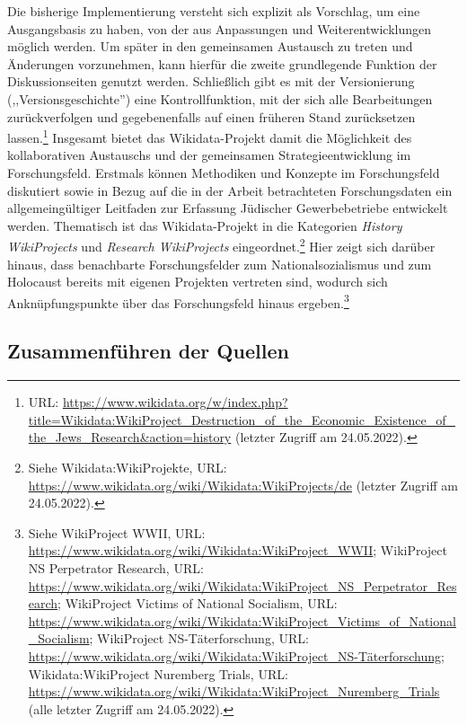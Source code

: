 Die bisherige Implementierung versteht sich explizit als Vorschlag, um eine Ausgangsbasis zu haben, von der aus Anpassungen und Weiterentwicklungen möglich werden. Um später in den gemeinsamen Austausch zu treten und Änderungen vorzunehmen, kann hierfür die zweite grundlegende Funktion der Diskussionseiten genutzt werden. Schließlich gibt es mit der Versionierung (,,Versionsgeschichte'') eine Kontrollfunktion, mit der sich alle Bearbeitungen zurückverfolgen und gegebenenfalls auf einen früheren Stand zurücksetzen lassen.\footnote{URL: \url{https://www.wikidata.org/w/index.php?title=Wikidata:WikiProject_Destruction_of_the_Economic_Existence_of_the_Jews_Research&action=history} (letzter Zugriff am 24.05.2022).} Insgesamt bietet das Wikidata-Projekt damit die Möglichkeit des kollaborativen Austauschs und der gemeinsamen Strategieentwicklung im Forschungsfeld. Erstmals können Methodiken und Konzepte im Forschungsfeld diskutiert sowie in Bezug auf die in der Arbeit betrachteten Forschungsdaten ein allgemeingültiger Leitfaden zur Erfassung Jüdischer Gewerbebetriebe entwickelt werden. Thematisch ist das Wikidata-Projekt in die Kategorien \textit{History WikiProjects} und \textit{Research WikiProjects} eingeordnet.\footnote{Siehe Wikidata:WikiProjekte, URL: \url{https://www.wikidata.org/wiki/Wikidata:WikiProjects/de} (letzter Zugriff am 24.05.2022).} Hier zeigt sich darüber hinaus, dass benachbarte Forschungsfelder zum Nationalsozialismus und zum Holocaust bereits mit eigenen Projekten vertreten sind, wodurch sich Anknüpfungspunkte über das Forschungsfeld hinaus ergeben.\footnote{Siehe WikiProject WWII, URL: \url{https://www.wikidata.org/wiki/Wikidata:WikiProject\_WWII}; WikiProject NS Perpetrator Research, URL: \url{https://www.wikidata.org/wiki/Wikidata:WikiProject\_NS\_Perpetrator\_Research}; WikiProject Victims of National Socialism, URL: \url{https://www.wikidata.org/wiki/Wikidata:WikiProject\_Victims\_of\_National\_Socialism}; WikiProject NS-Täterforschung, URL: \url{https://www.wikidata.org/wiki/Wikidata:WikiProject\_NS-Täterforschung}; Wikidata:WikiProject Nuremberg Trials, URL: \url{https://www.wikidata.org/wiki/Wikidata:WikiProject\_Nuremberg\_Trials} (alle letzter Zugriff am 24.05.2022).} 

\subsection{Zusammenführen der Quellen}


